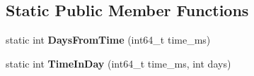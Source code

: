 \subsection*{Static Public Member Functions}
\begin{DoxyCompactItemize}
\item 
static int {\bfseries Days\+From\+Time} (int64\+\_\+t time\+\_\+ms)\hypertarget{classv8_1_1internal_1_1_date_cache_aad8fb01f0a57bc43277def6da5993aae}{}\label{classv8_1_1internal_1_1_date_cache_aad8fb01f0a57bc43277def6da5993aae}

\item 
static int {\bfseries Time\+In\+Day} (int64\+\_\+t time\+\_\+ms, int days)\hypertarget{classv8_1_1internal_1_1_date_cache_a3027a581b156086c088deca2a2a5f768}{}\label{classv8_1_1internal_1_1_date_cache_a3027a581b156086c088deca2a2a5f768}

\end{DoxyCompactItemize}
